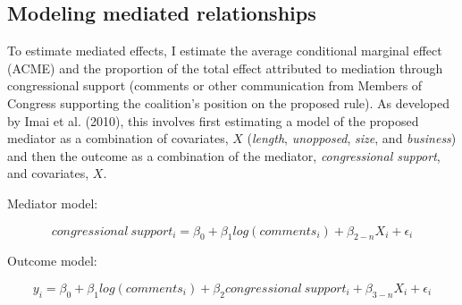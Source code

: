 \documentclass[
      12pt,
        ]{article}
\begin{document}
\hypertarget{modeling-mediated-relationships}{%
\subsection{Modeling mediated relationships}\label{modeling-mediated-relationships}}

To estimate mediated effects, I estimate the average conditional marginal effect (ACME) and the proportion of the total effect attributed to mediation through congressional support (comments or other communication from Members of Congress supporting the coalition's position on the proposed rule). As developed by Imai et al. (2010), this involves first estimating a model of the proposed mediator as a combination of covariates, \(X\) (\emph{length}, \emph{unopposed}, \emph{size}, and \emph{business}) and then the outcome as a combination of the mediator, \emph{congressional support}, and covariates, \(X\).

Mediator model:

\[
congressional\ support_i = \beta_0 + \beta_1 log(comments_i) + \beta_{2-n} X_i + \epsilon_i
\]

Outcome model:

\[
y_i = \beta_0 + \beta_1 log(comments_i) + \beta_2 congressional\ support_i + \beta_{3-n} X_i + \epsilon_i
\]
\newpage
\singlespacing 
           
  
\end{document}
